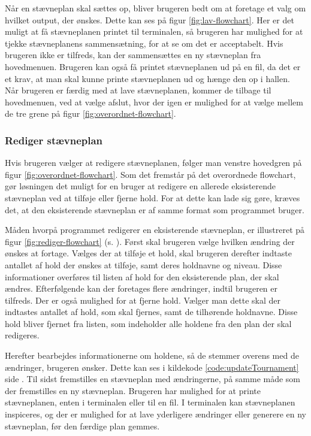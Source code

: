 Når en stævneplan skal sættes op, bliver brugeren bedt om at foretage et valg om hvilket output, der ønskes. Dette kan ses på figur \ref{fig:lav-flowchart}. Her er det muligt at få stævneplanen printet til terminalen, så brugeren har mulighed for at tjekke stævneplanens sammensætning, for at se om det er acceptabelt. Hvis brugeren ikke er tilfreds, kan der sammensættes en ny stævneplan fra hovedmenuen. Brugeren kan også få printet stævneplanen ud på en fil, da det er et krav, at man skal kunne printe stævneplanen ud og hænge den op i hallen.\\
Når brugeren er færdig med at lave stævneplanen, kommer de tilbage til hovedmenuen, ved at vælge afslut, hvor der igen er mulighed for at vælge mellem de tre grene på figur \ref{fig:overordnet-flowchart}.

\subsubsection{Rediger stævneplan}
Hvis brugeren vælger at redigere stævneplanen, følger man venstre hovedgren på figur \ref{fig:overordnet-flowchart}. Som det fremstår på det overordnede flowchart, gør løsningen det muligt for en bruger at redigere en allerede eksisterende stævneplan ved at tilføje eller fjerne hold. For at dette kan lade sig gøre, kræves det, at den eksisterende stævneplan er af samme format som programmet bruger.
\par
Måden hvorpå programmet redigerer en eksisterende stævneplan, er illustreret på figur \ref{fig:rediger-flowchart} (s. \pageref{fig:rediger-flowchart}). Først skal brugeren vælge hvilken ændring der ønskes at fortage. Vælges der at tilføje et hold, skal brugeren derefter indtaste antallet af hold der ønskes at tilføje, samt deres holdnavne og niveau. Disse informationer overføres til listen af hold for den eksisterende plan, der skal ændres. Efterfølgende kan der foretages flere ændringer, indtil brugeren er tilfreds. Der er også mulighed for at fjerne hold. Vælger man dette skal der indtastes antallet af hold, som skal fjernes, samt de tilhørende holdnavne. Disse hold bliver fjernet fra listen, som indeholder alle holdene fra den plan der skal redigeres.
\par
Herefter bearbejdes informationerne om holdene, så de stemmer overens med de ændringer, brugeren ønsker. Dette kan ses i kildekode \ref{code:updateTournament} side \pageref{code:updateTournament}. Til sidst fremstilles en stævneplan med ændringerne, på samme måde som der fremstilles en ny stævneplan. Brugeren har mulighed for at printe stævneplanen, enten i terminalen eller til en fil. I terminalen kan stævneplanen inspiceres, og der er mulighed for at lave yderligere ændringer eller generere en ny stævneplan, før den færdige plan gemmes.

